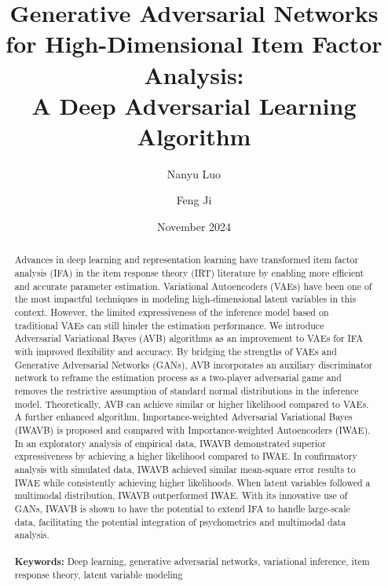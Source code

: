 \documentclass[a4paper,12pt]{article}
\title{Generative Adversarial Networks for High-Dimensional Item Factor Analysis:\\ A Deep Adversarial Learning Algorithm}
\author[1]{Nanyu Luo}
\author[1,\correspondingauthor]{Feng Ji}
\affil[1]{University of Toronto}
\date{November 2024}
\theoremstyle{plain} %
\theoremstyle{remark} %
\theoremstyle{definition} %
\begin{document}
\maketitle

\begin{abstract}
Advances in deep learning and representation learning have transformed item factor analysis (IFA) in the item response theory (IRT) literature by enabling more efficient and accurate parameter estimation. Variational Autoencoders (VAEs) have been one of the most impactful techniques in modeling high-dimensional latent variables in this context. However, the limited expressiveness of the inference model based on traditional VAEs can still hinder the estimation performance. We introduce Adversarial Variational Bayes (AVB) algorithms as an improvement to VAEs for IFA with improved flexibility and accuracy. By bridging the strengths of VAEs and Generative Adversarial Networks (GANs), AVB incorporates an auxiliary discriminator network to reframe the estimation process as a two-player adversarial game and removes the restrictive assumption of standard normal distributions in the inference model. Theoretically, AVB can achieve similar or higher likelihood compared to VAEs. A further enhanced algorithm, Importance-weighted Adversarial Variational Bayes (IWAVB) is proposed and compared with Importance-weighted Autoencoders (IWAE). In an exploratory analysis of empirical data, IWAVB demonstrated superior expressiveness by achieving a higher likelihood compared to IWAE. In confirmatory analysis with simulated data, IWAVB achieved similar mean-square error results to IWAE while consistently achieving higher likelihoods. When latent variables followed a multimodal distribution, IWAVB outperformed IWAE. With its innovative use of GANs, IWAVB is shown to have the potential to extend IFA to handle large-scale data, facilitating the potential integration of psychometrics and multimodal data analysis.
\\~\\

\noindent\textbf{Keywords:} Deep learning, generative adversarial networks, variational inference, item response theory, latent variable modeling


\end{abstract}
\begin{comment}
\end{comment}
\end{document}

